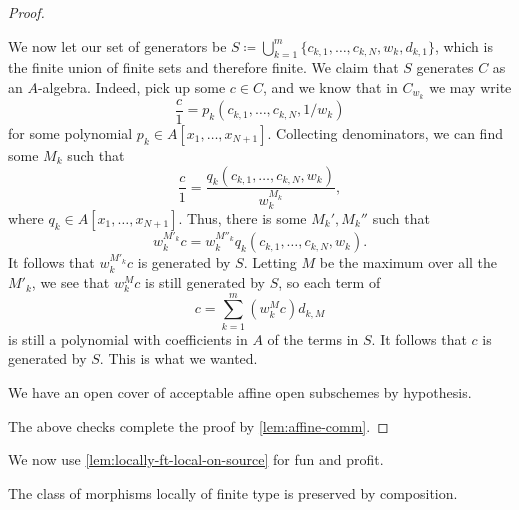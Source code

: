 \documentclass[../notes.tex]{subfiles}
\begin{document}
\begin{proof}
\begin{listroman}
		We now let our set of generators be $S\coloneqq\bigcup_{k=1}^m\{c_{k,1},\ldots,c_{k,N},w_k,d_{k,1}\}$, which is the finite union of finite sets and therefore finite. We claim that $S$ generates $C$ as an $A$-algebra. Indeed, pick up some $c\in C$, and we know that in $C_{w_k}$ we may write
		\[\frac c1=p_k\left(c_{k,1},\ldots,c_{k,N},1/w_k\right)\]
		for some polynomial $p_k\in A[x_1,\ldots,x_{N+1}]$. Collecting denominators, we can find some $M_k$ such that
		\[\frac c1=\frac{q_k(c_{k,1},\ldots,c_{k,N},w_k)}{w_k^{M_k}},\]
		where $q_k\in A[x_1,\ldots,x_{N+1}]$. Thus, there is some $M_k',M_k''$ such that
		\[w_k^{M'_k}c=w_k^{M''_k}q_k(c_{k,1},\ldots,c_{k,N},w_k).\]
		It follows that $w_k^{M'_k}c$ is generated by $S$. Letting $M$ be the maximum over all the $M'_k$, we see that $w_k^Mc$ is still generated by $S$, so each term of
		\[c=\sum_{k=1}^m\left(w_k^Mc\right)d_{k,M}\]
		is still a polynomial with coefficients in $A$ of the terms in $S$. It follows that $c$ is generated by $S$. This is what we wanted.

		\item We have an open cover of acceptable affine open subschemes by hypothesis.
	\end{listroman}
	The above checks complete the proof by \autoref{lem:affine-comm}.
\end{proof}
We now use \autoref{lem:locally-ft-local-on-source} for fun and profit.
\begin{lemma} \label{lem:locally-ft-comp}
	The class of morphisms locally of finite type is preserved by composition.
\end{lemma}
\end{document}

